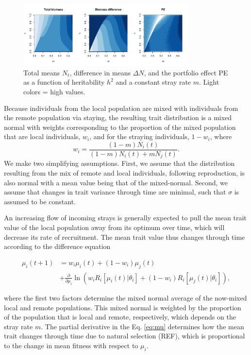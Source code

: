 \documentclass[twocolumn,preprintnumbers,amsmath,amssymb,superscriptaddress]{revtex4}
\begin{document}
\begin{figure}
  \captionsetup{justification=raggedright,
singlelinecheck=false
}
\centering
\includegraphics[width=0.8\textwidth]{figs/fig_MDPE_hm.pdf}
\caption{
Total means $N_t$, difference in means $\Delta N$, and the portfolio effect PE as a function of heritability $h^2$ and a constant stray rate $m$. Light colors = high values.
} \label{fig:PE}
\end{figure}

Because individuals from the local population are mixed with individuals from the remote population via staying, the resulting trait distribution is a mixed normal with weights corresponding to the proportion of the mixed population that are local individuals, $w_i$, and for the straying individuals, $1-w_i$, where 
\begin{equation}
w_i=\frac{(1-m)N_i(t)}{(1-m) N_i(t) + m N_j(t)}.
\end{equation}
We make two simplifying assumptions.
First, we assume that the distribution resulting from the mix of remote and local individuals, following reproduction, is also normal with a mean value being that of the mixed-normal.
Second, we assume that changes in trait variance through time are minimal, such that $\sigma$ is assumed to be constant.



An increasing flow of incoming strays is generally expected to pull the mean trait value of the local population away from its optimum over time, which will decrease its rate of recruitment.
The mean trait value thus changes through time according to the difference equation

\begin{align}
  \mu_i(t+1) &= w_i\mu_i(t) + (1-w_i)\mu_j(t) \\ \nonumber
  &+ \frac{\partial}{\partial \mu_i}\ln\left(w_i R_i[\mu_i(t)|\theta_i] + (1-w_i)R_i[\mu_j(t)|\theta_i]  \right),
  \label{eq:mu}
\end{align}

\noindent where the first two factors determine the mixed normal average of the now-mixed local and remote populations.
This mixed normal is weighted by the proportion of the population that is local and remote, respectively, which depends on the stray rate $m$.
The partial derivative in the Eq. \ref{eq:mu} determines how the mean trait changes through time due to natural selection (REF), which is proportional to the change in mean fitness with respect to $\mu_i$.
\end{document}
